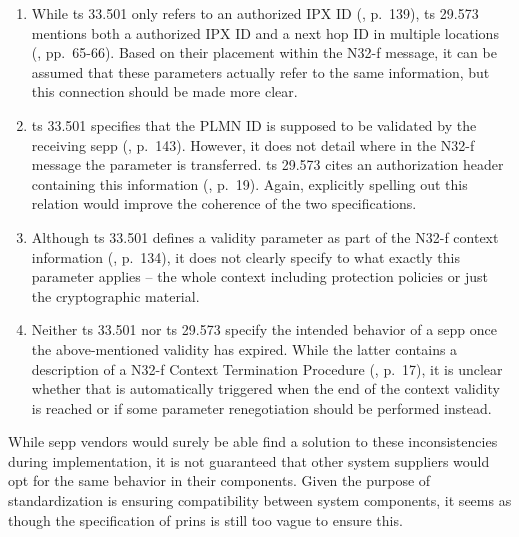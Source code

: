 \begin{enumerate}[label=--]
\item While \gls{ts} 33.501 only refers to an {\sffamily authorized IPX ID} (\cite{3gpp.33.501}, p.~139), \gls{ts} 29.573 mentions both a {\sffamily authorized IPX ID} and a {\sffamily next hop ID} in multiple locations (\cite{3gpp.29.573}, pp.~65-66). Based on their placement within the N32-f message, it can be assumed that these parameters actually refer to the same information, but this connection should be made more clear.

\item \gls{ts} 33.501 specifies that the {\sffamily PLMN ID} is supposed to be validated by the receiving \gls{sepp} (\cite{3gpp.33.501}, p.~143). However, it does not detail where in the N32-f message the parameter is transferred. \gls{ts} 29.573 cites an authorization header containing this information (\cite{3gpp.29.573}, p.~19). Again, explicitly spelling out this relation would improve the coherence of the two specifications.

\item Although \gls{ts} 33.501 defines a validity parameter as part of the N32-f context information (\cite{3gpp.33.501}, p.~134), it does not clearly specify to what exactly this parameter applies -- the whole context including protection policies or just the cryptographic material.

\item Neither \gls{ts} 33.501 nor \gls{ts} 29.573 specify the intended behavior of a \gls{sepp} once the above-mentioned validity has expired. While the latter contains a description of a N32-f Context Termination Procedure (\cite{3gpp.29.573}, p.~17), it is unclear whether that is automatically triggered when the end of the context validity is reached or if some parameter renegotiation should be performed instead.
\end{enumerate}

While \gls{sepp} vendors would surely be able find a solution to these inconsistencies during implementation, it is not guaranteed that other system suppliers would opt for the same behavior in their components.
Given the purpose of standardization is ensuring compatibility between system components, it seems as though the specification of \gls{prins} is still too vague to ensure this.